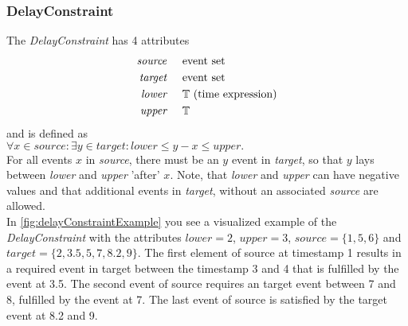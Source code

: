 	\subsubsection{DelayConstraint}
		The \emph{DelayConstraint} has 4 attributes
		\begin{align*}
			\emph{source} & \hspace{.5cm}\text{event set}\\
			\emph{target} & \hspace{.5cm}\text{event set}\\
			\emph{lower}  & \hspace{.5cm}\text{$\mathbb{T}$ (time expression)}\\
			\emph{upper}  & \hspace{.5cm}\text{$\mathbb{T}$}
		\end{align*}
		and is defined as\\[10pt]
		\begin{math}
			\forall x\in source:\exists y\in target: lower\leq y-x\leq upper.
		\end{math}\\[10pt]
		For all events $x$ in \emph{source}, there must be an $y$ event in \emph{target}, so that $y$ lays between \emph{lower} and \emph{upper} 'after' $x$. Note, that \emph{lower} and \emph{upper} can have negative values and that additional events in \emph{target}, without an associated \emph{source} are allowed.\\
		In \ref{fig:delayConstraintExample} you see a visualized example of the \emph{DelayConstraint} with the attributes $lower=2$, $upper=3$, $source=\{1, 5, 6\}$ and $target=\{2, 3.5, 5, 7, 8.2, 9\}$. The first element of source at timestamp 1 results in a required event in target between the timestamp 3 and 4 that is fulfilled by the event at 3.5. The second event of source requires an target event between 7 and 8, fulfilled by the event at 7. The last event of source is satisfied by the target event at 8.2 and 9.
